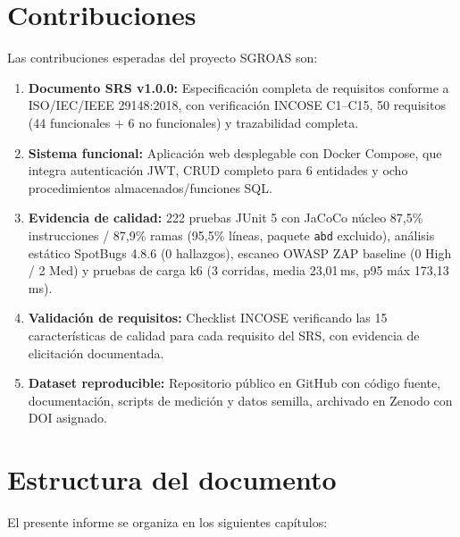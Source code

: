 \section{Contribuciones}
\label{sec:contribuciones}

Las contribuciones esperadas del proyecto SGROAS son:

\begin{enumerate}
  \item \textbf{Documento SRS v1.0.0:} Especificación completa de requisitos conforme a ISO/IEC/IEEE 29148:2018, con verificación INCOSE C1--C15, 50 requisitos (44 funcionales + 6 no funcionales) y trazabilidad completa.

  \item \textbf{Sistema funcional:} Aplicación web desplegable con Docker Compose, que integra autenticación JWT, CRUD completo para 6 entidades y ocho procedimientos almacenados/funciones SQL.

  \item \textbf{Evidencia de calidad:} 222 pruebas JUnit 5 con JaCoCo núcleo 87,5\% instrucciones / 87,9\% ramas (95,5\% líneas, paquete \texttt{abd} excluido), análisis estático SpotBugs 4.8.6 (0 hallazgos), escaneo OWASP ZAP baseline (0 High / 2 Med) y pruebas de carga k6 (3 corridas, media 23,01\,ms, p95 máx 173,13\,ms).

  \item \textbf{Validación de requisitos:} Checklist INCOSE verificando las 15 características de calidad para cada requisito del SRS, con evidencia de elicitación documentada.

  \item \textbf{Dataset reproducible:} Repositorio público en GitHub con código fuente, documentación, scripts de medición y datos semilla, archivado en Zenodo con DOI asignado.
\end{enumerate}

\section{Estructura del documento}
\label{sec:estructura}

El presente informe se organiza en los siguientes capítulos:

